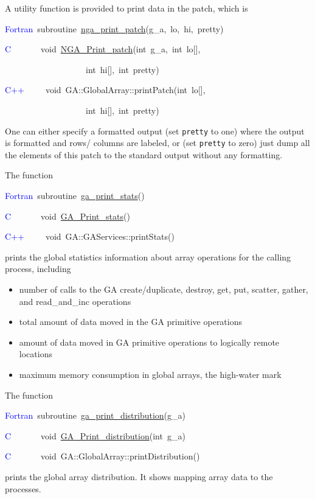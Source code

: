 A utility function is provided to print data in the patch, which is
\begin{lyxcode}
\textcolor{blue}{Fortran}~subroutine~\href{http://www.emsl.pnl.gov/docs/global/ga_ops.html\#ga_print_patch}{nga\_{}print\_{}patch}(g\_a,~lo,~hi,~pretty)~

\textcolor{blue}{C}~~~~~~~void~\href{http://www.emsl.pnl.gov/docs/global/c_nga_ops.html\#ga_print_patch}{NGA\_{}Print\_{}patch}(int~g\_a,~int~lo{[}{]},~

~~~~~~~~~~~~~~~~~~~int~hi{[}{]},~int~pretty)~

\textcolor{blue}{C++}~~~~~void~GA::GlobalArray::printPatch(int~lo{[}{]},~

~~~~~~~~~~~~~~~~~~~int~hi{[}{]},~int~pretty)
\end{lyxcode}
One can either specify a formatted output (set \texttt{pretty} to
one) where the output is formatted and rows/ columns are labeled,
or (set \texttt{pretty} to zero) just dump all the elements of this
patch to the standard output without any formatting.

The function
\begin{lyxcode}
\textcolor{blue}{Fortran}~subroutine~\href{http://www.emsl.pnl.gov/docs/global/ga_ops.html\#ga_print_stats}{ga\_{}print\_{}stats}()~

\textcolor{blue}{C}~~~~~~~void~\href{http://www.emsl.pnl.gov/docs/global/c_nga_ops.html\#ga_print_stats}{GA\_{}Print\_{}stats}()~

\textcolor{blue}{C++}~~~~~void~GA::GAServices::printStats()
\end{lyxcode}
prints the global statistics information about array operations for
the calling process, including
\begin{itemize}
\item number of calls to the GA create/duplicate, destroy, get, put, scatter,
gather, and read\_and\_inc operations 
\item total amount of data moved in the GA primitive operations 
\item amount of data moved in GA primitive operations to logically remote
locations 
\item maximum memory consumption in global arrays, the \textquotedbl{}high-water
mark\textquotedbl{}
\end{itemize}
The function
\begin{lyxcode}
\textcolor{blue}{Fortran}~subroutine~\href{http://www.emsl.pnl.gov/docs/global/ga_ops.html\#ga_print_distribution}{ga\_{}print\_{}distribution}(g\_a)~

\textcolor{blue}{C~}~~~~~~void~\href{http://www.emsl.pnl.gov/docs/global/c_nga_ops.html\#ga_print_distribution}{GA\_{}Print\_{}distribution}(int~g\_a)

\textcolor{blue}{C}~~~~~~~void~GA::GlobalArray::printDistribution()
\end{lyxcode}
prints the global array distribution. It shows mapping array data
to the processes.

